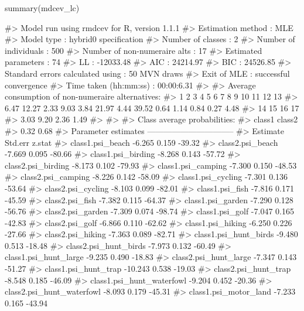\begin{Schunk}
\begin{Sinput}
summary(mdcev_lc)
\end{Sinput}
\begin{Soutput}
#> Model run using rmdcev for R, version 1.1.1 
#> Estimation method                : MLE
#> Model type                       : hybrid0 specification
#> Number of classes                : 2
#> Number of individuals            : 500
#> Number of non-numeraire alts     : 17
#> Estimated parameters             : 74
#> LL                               : -12033.48
#> AIC                              : 24214.97
#> BIC                              : 24526.85
#> Standard errors calculated using : 50 MVN draws
#> Exit of MLE                      : successful convergence
#> Time taken (hh:mm:ss)            : 00:00:6.31
#> 
#> Average consumption of non-numeraire alternatives:
#>     1     2     3     4     5     6     7     8     9    10    11    12    13 
#>  6.47 12.27  2.33  9.03  3.84 21.97  4.44 39.52  0.64  1.14  0.84  0.27  4.48 
#>    14    15    16    17 
#>  3.03  9.20  2.36  1.49 
#> 
#> 
#> Class average probabilities:
#> class1 class2 
#>   0.32   0.68 
#> Parameter estimates --------------------------------  
#>                           Estimate Std.err z.stat
#> class1.psi_beach            -6.265   0.159 -39.32
#> class2.psi_beach            -7.669   0.095 -80.66
#> class1.psi_birding          -8.268   0.143 -57.72
#> class2.psi_birding          -8.173   0.102 -79.93
#> class1.psi_camping          -7.300   0.150 -48.53
#> class2.psi_camping          -8.226   0.142 -58.09
#> class1.psi_cycling          -7.301   0.136 -53.64
#> class2.psi_cycling          -8.103   0.099 -82.01
#> class1.psi_fish             -7.816   0.171 -45.59
#> class2.psi_fish             -7.382   0.115 -64.37
#> class1.psi_garden           -7.290   0.128 -56.76
#> class2.psi_garden           -7.309   0.074 -98.74
#> class1.psi_golf             -7.047   0.165 -42.83
#> class2.psi_golf             -6.866   0.110 -62.62
#> class1.psi_hiking           -6.250   0.226 -27.66
#> class2.psi_hiking           -7.363   0.089 -82.71
#> class1.psi_hunt_birds       -9.480   0.513 -18.48
#> class2.psi_hunt_birds       -7.973   0.132 -60.49
#> class1.psi_hunt_large       -9.235   0.490 -18.83
#> class2.psi_hunt_large       -7.347   0.143 -51.27
#> class1.psi_hunt_trap       -10.243   0.538 -19.03
#> class2.psi_hunt_trap        -8.548   0.185 -46.09
#> class1.psi_hunt_waterfowl   -9.204   0.452 -20.36
#> class2.psi_hunt_waterfowl   -8.093   0.179 -45.31
#> class1.psi_motor_land       -7.233   0.165 -43.94

\end{Soutput}
\end{Schunk}
